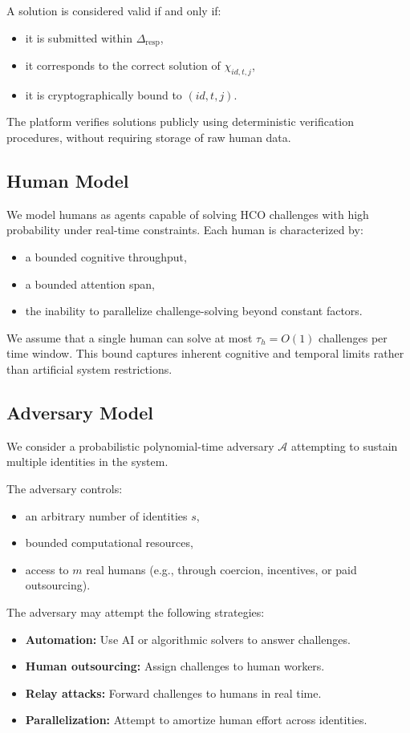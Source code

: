 \documentclass[sigconf,nonacm]{acmart}
\begin{document}
A solution is considered valid if and only if:
\begin{itemize}
	\item it is submitted within $\Delta_{\mathrm{resp}}$,
	\item it corresponds to the correct solution of $\chi_{id,t,j}$,
	\item it is cryptographically bound to $(id,t,j)$.
\end{itemize}

The platform verifies solutions publicly using deterministic verification procedures, without requiring storage of raw human data.

\subsection{Human Model}

We model humans as agents capable of solving HCO challenges with high probability under real-time constraints. Each human is characterized by:
\begin{itemize}
	\item a bounded cognitive throughput,
	\item a bounded attention span,
	\item the inability to parallelize challenge-solving beyond constant factors.
\end{itemize}

We assume that a single human can solve at most $\tau_h = O(1)$ challenges per time window. This bound captures inherent cognitive and temporal limits rather than artificial system restrictions.

\subsection{Adversary Model}

We consider a probabilistic polynomial-time adversary $\mathcal{A}$ attempting to sustain multiple identities in the system.

The adversary controls:
\begin{itemize}
	\item an arbitrary number of identities $s$,
	\item bounded computational resources,
	\item access to $m$ real humans (e.g., through coercion, incentives, or paid outsourcing).
\end{itemize}

The adversary may attempt the following strategies:
\begin{itemize}
	\item \textbf{Automation:} Use AI or algorithmic solvers to answer challenges.
	\item \textbf{Human outsourcing:} Assign challenges to human workers.
	\item \textbf{Relay attacks:} Forward challenges to humans in real time.
	\item \textbf{Parallelization:} Attempt to amortize human effort across identities.
\end{itemize}
\end{document}

